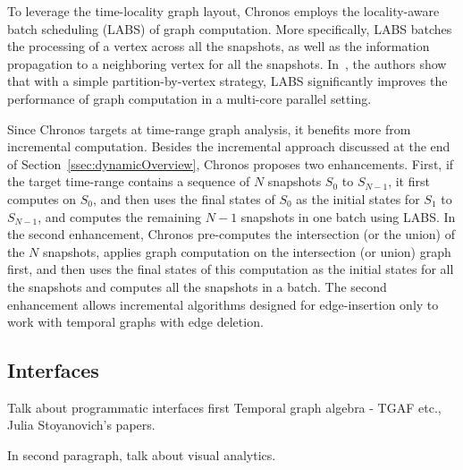 \documentclass{svjour3}
\begin{document}
\vspace{2mm}

 To leverage the time-locality graph layout, Chronos employs the locality-aware batch scheduling (LABS) of graph computation. More specifically, LABS batches the processing of a vertex across all the snapshots, as well as the information propagation to a neighboring vertex for all the snapshots. %
In~\cite{han2014chronos}, the authors show that with a simple partition-by-vertex strategy, LABS significantly improves the performance of graph computation in a multi-core parallel setting.

\vspace{2mm}

 Since Chronos targets at time-range graph analysis, it benefits more from incremental computation. Besides the incremental approach discussed at the end of Section~\ref{ssec:dynamicOverview}, Chronos proposes two enhancements. First, if the target time-range contains a sequence of $N$ snapshots $S_0$ to $S_{N-1}$, it first computes on $S_0$, and then uses the final states of $S_0$ as the initial states for $S_1$ to $S_{N-1}$, and computes the remaining $N-1$ snapshots in one batch using LABS. In the second enhancement, Chronos pre-computes the intersection (or the union) of the $N$ snapshots, applies graph computation on the intersection (or union) graph first, and then uses the final states of this computation as the initial states for all the snapshots and computes all the snapshots in a batch. The second enhancement allows incremental algorithms designed for edge-insertion only to work with temporal graphs with edge deletion.

\vspace{2mm}



\subsection{Interfaces}
Talk about programmatic interfaces first Temporal graph algebra - TGAF etc., Julia Stoyanovich's papers. 

In second paragraph, talk about visual analytics.
\end{document}
